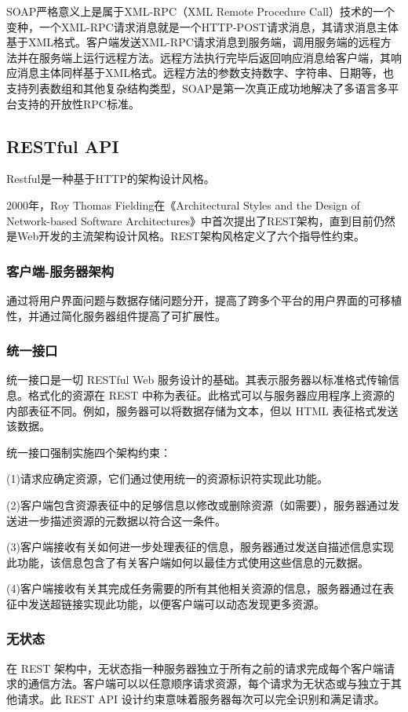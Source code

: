 \documentclass[a4paper,twoside]{scrbook}
\begin{document}
\begin{CJK}{UTF8}{gbsn}
SOAP严格意义上是属于XML-RPC（XML Remote Procedure Call）技术的一个变种，一个XML-RPC请求消息就是一个HTTP-POST请求消息，其请求消息主体基于XML格式。客户端发送XML-RPC请求消息到服务端，调用服务端的远程方法并在服务端上运行远程方法。远程方法执行完毕后返回响应消息给客户端，其响应消息主体同样基于XML格式。远程方法的参数支持数字、字符串、日期等，也支持列表数组和其他复杂结构类型，SOAP是第一次真正成功地解决了多语言多平台支持的开放性RPC标准。
\subsection{RESTful API}
Restful是一种基于HTTP的架构设计风格。

2000年，Roy Thomas Fielding在《Architectural Styles and the Design of Network-based Software Architectures》\cite{fielding2000architectural}中首次提出了REST架构，直到目前仍然是Web开发的主流架构设计风格。REST架构风格定义了六个指导性约束。
\subsubsection{客户端-服务器架构}
通过将用户界面问题与数据存储问题分开，提高了跨多个平台的用户界面的可移植性，并通过简化服务器组件提高了可扩展性。
\subsubsection{统一接口}
统一接口是一切 RESTful Web 服务设计的基础。其表示服务器以标准格式传输信息。格式化的资源在 REST 中称为表征。此格式可以与服务器应用程序上资源的内部表征不同。例如，服务器可以将数据存储为文本，但以 HTML 表征格式发送该数据。

统一接口强制实施四个架构约束：

(1)请求应确定资源，它们通过使用统一的资源标识符实现此功能。

(2)客户端包含资源表征中的足够信息以修改或删除资源（如需要），服务器通过发送进一步描述资源的元数据以符合这一条件。

(3)客户端接收有关如何进一步处理表征的信息，服务器通过发送自描述信息实现此功能，该信息包含了有关客户端如何以最佳方式使用这些信息的元数据。

(4)客户端接收有关其完成任务需要的所有其他相关资源的信息，服务器通过在表征中发送超链接实现此功能，以便客户端可以动态发现更多资源。
\subsubsection{无状态}
在 REST 架构中，无状态指一种服务器独立于所有之前的请求完成每个客户端请求的通信方法。客户端可以以任意顺序请求资源，每个请求为无状态或与独立于其他请求。此 REST API 设计约束意味着服务器每次可以完全识别和满足请求。 

\end{CJK}
\end{document}
